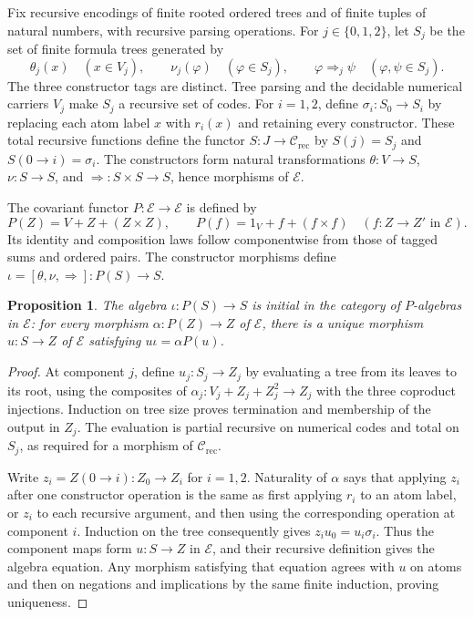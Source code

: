 \documentclass[11pt]{article}
\newtheorem{proposition}[theorem]{Proposition}
\begin{document}
Fix recursive encodings of finite rooted ordered trees and of finite
tuples of natural numbers, with recursive parsing operations. For
$j\in\{0,1,2\}$, let $S_j$ be the set of finite formula trees
generated by
\[
 \theta_j(x)\quad(x\in V_j),\qquad
 \nu_j(\varphi)\quad(\varphi\in S_j),\qquad
 \varphi\Rightarrow_j\psi\quad(\varphi,\psi\in S_j).
\]
The three constructor tags are distinct. Tree parsing and the
decidable numerical carriers $V_j$ make $S_j$ a recursive set of
codes. For $i=1,2$, define $\sigma_i:S_0\to S_i$ by replacing
each atom label $x$ with $r_i(x)$ and retaining every constructor.
These total recursive functions define the functor
$S:J\to\mathcal C_{\mathrm{rec}}$ by $S(j)=S_j$ and
$S(0\to i)=\sigma_i$. The constructors form natural transformations
$\theta:V\to S$, $\nu:S\to S$, and
$\Rightarrow:S\times S\to S$, hence morphisms of $\mathcal E$.

The covariant functor $P:\mathcal E\to\mathcal E$ is defined by
\[
 P(Z)=V+Z+(Z\times Z),\qquad
 P(f)=1_V+f+(f\times f)
 \quad(f:Z\to Z'\text{ in }\mathcal E).
\]
Its identity and composition laws follow componentwise from those
of tagged sums and ordered pairs. The constructor morphisms define
$\iota=[\theta,\nu,\Rightarrow]:P(S)\to S$.

\begin{proposition}\label{prop:fork-syntax-initial}
The algebra $\iota:P(S)\to S$ is initial in the category of
$P$-algebras in $\mathcal E$: for every morphism
$\alpha:P(Z)\to Z$ of $\mathcal E$, there is a unique morphism
$u:S\to Z$ of $\mathcal E$ satisfying $u\iota=\alpha P(u)$.
\end{proposition}
\begin{proof}
At component $j$, define $u_j:S_j\to Z_j$ by evaluating a tree
from its leaves to its root, using the composites of
$\alpha_j:V_j+Z_j+Z_j^2\to Z_j$ with the three coproduct injections.
Induction on tree size proves termination and membership
of the output in $Z_j$. The evaluation is partial recursive on
numerical codes and total on $S_j$, as required for a morphism of
$\mathcal C_{\mathrm{rec}}$.

Write $z_i=Z(0\to i):Z_0\to Z_i$ for $i=1,2$. Naturality of
$\alpha$ says that applying $z_i$ after one constructor operation
is the same as first applying $r_i$ to an atom label, or $z_i$
to each recursive argument, and then using the corresponding
operation at component $i$. Induction on the tree consequently
gives $z_i u_0=u_i\sigma_i$. Thus the component maps form
$u:S\to Z$ in $\mathcal E$, and their recursive definition gives
the algebra equation. Any morphism satisfying that equation agrees
with $u$ on atoms and then on negations and implications by the
same finite induction, proving uniqueness.
\end{proof}
\end{document}

